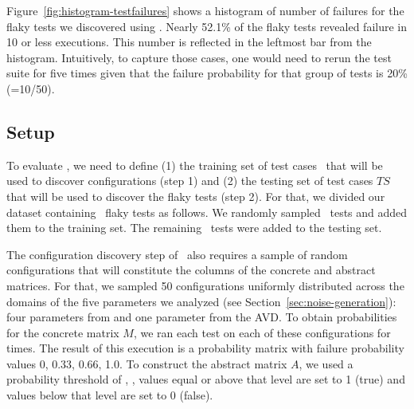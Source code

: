 \documentclass[conference]{IEEEtran}
\begin{document}
Figure~\ref{fig:histogram-testfailures} shows a histogram of number of failures for the \numflakytestsds{} flaky tests we discovered using \rerun. Nearly 52.1\% of the flaky tests revealed failure in 10 or less executions. This number is reflected in the leftmost bar from the histogram. Intuitively, to capture those cases, one would need to rerun the test suite for five times given that the failure probability for that group of tests is 20\% (=10/50). 

\subsection{Setup}
\label{sec:setup}

To evaluate \tname{}, we need to define (1) the training set of test cases \tr\ that will be used to discover configurations (step 1) and (2) the testing set of test cases $\mathit{TS}$ that will be used to discover the flaky tests (step 2). For that, we divided our dataset containing \numflakytestsds\ flaky tests as follows. We randomly sampled \numflakytraining\ tests and added them to the training set. The remaining \numflakytesting\ tests were added to the testing set.

The configuration discovery step of \tname\ also requires a sample of random configurations that will constitute the columns of the concrete and abstract matrices. For that, we sampled 50 configurations uniformly distributed across the domains of the five parameters we analyzed (see Section~\ref{sec:noise-generation}): four parameters from \sng{} and one parameter from the AVD. To obtain probabilities for the concrete matrix $M$, we ran each test on each of these configurations for \numReRunstrainingLONG{} times. The result of this execution is a probability matrix with failure probability values 0, 0.33, 0.66, 1.0. To construct the abstract matrix $A$, we used a probability threshold of \threshold{}, \ie{}, values equal or above that level are set to 1 (true) and values below that level are set to 0 (false).




\end{document}
